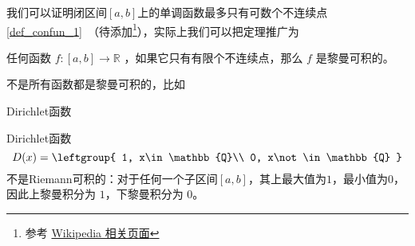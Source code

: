 我们可以证明闭区间$[a, b]$上的单调函数最多只有可数个不连续点\autoref{def_confun_1}~（待添加\footnote{参考 \href{https://en.wikipedia.org/wiki/Discontinuities_of_monotone_functions}{Wikipedia 相关页面}}），实际上我们可以把定理推广为

\begin{theorem}{}
任何函数 $f: [a, b] \to \mathbb{R}$ ，如果它只有有限个不连续点，那么 $f$ 是黎曼可积的。
\end{theorem}





不是所有函数都是黎曼可积的，比如

\begin{example}{Dirichlet函数}

Dirichlet函数
\begin{equation}
D(x)=
\leftgroup{
    1, x\in\mathbb{Q}\\
    0, x\not\in\mathbb{Q}
}
\end{equation}
不是Riemann可积的：对于任何一个子区间$[a, b]$，其上最大值为$1$，最小值为$0$，因此上黎曼积分为 $1$，下黎曼积分为 $0$。
\end{example}

